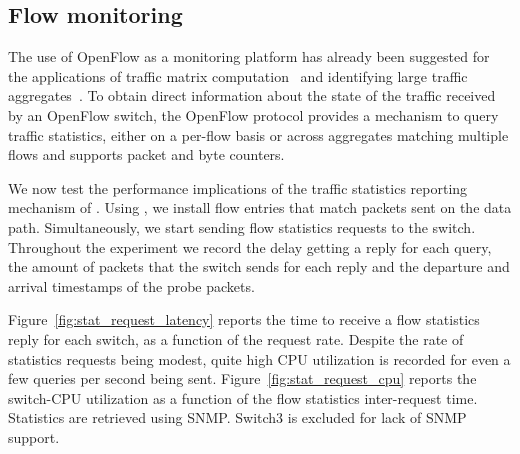 \subsection{Flow monitoring}\label{sec:results-monitoring}

The use of OpenFlow as a monitoring platform has already been
suggested for the applications of traffic matrix
computation~\cite{opentm-pam,tm-presto} and identifying large traffic
aggregates~\cite{openflow-measurement-hotice}. To obtain direct
information about the state of the traffic received by an OpenFlow
switch, the OpenFlow protocol provides a mechanism to query traffic
statistics, either on a per-flow basis or across aggregates matching
multiple flows and supports packet and byte counters. 

We now test the performance implications of the traffic statistics reporting 
mechanism of \of. Using \oflops, we install flow entries that match 
packets sent on the data path. Simultaneously, we start sending flow statistics 
requests to the switch. Throughout the experiment we record the delay getting 
a reply for each query, the amount of packets that the switch sends for each 
reply and the departure and arrival timestamps of the probe packets.

Figure~\ref{fig:stat_request_latency} reports the time to receive a flow
statistics reply for each switch, as a function of the request
rate. Despite the rate of statistics requests being modest, quite high
CPU utilization is recorded for even a few queries per second being
sent. Figure~\ref{fig:stat_request_cpu} reports the switch-CPU utilization
as a function of the flow statistics inter-request time. Statistics
are retrieved using SNMP. Switch3 is excluded for lack of SNMP
support.

